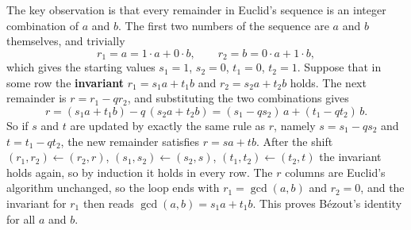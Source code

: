 The key observation is that every remainder in Euclid's sequence is an integer combination of $a$ and $b$. The first two numbers of the sequence are $a$ and $b$ themselves, and trivially
\[
r_1 = a = 1 \cdot a + 0 \cdot b, \qquad r_2 = b = 0 \cdot a + 1 \cdot b,
\]
which gives the starting values $s_1 = 1$, $s_2 = 0$, $t_1 = 0$, $t_2 = 1$. Suppose that in some row the \textbf{invariant} $r_1 = s_1 a + t_1 b$ and $r_2 = s_2 a + t_2 b$ holds. The next remainder is $r = r_1 - q r_2$, and substituting the two combinations gives
\[
r = (s_1 a + t_1 b) - q\,(s_2 a + t_2 b) = (s_1 - q s_2)\,a + (t_1 - q t_2)\,b .
\]
So if $s$ and $t$ are updated by exactly the same rule as $r$, namely $s = s_1 - q s_2$ and $t = t_1 - q t_2$, the new remainder satisfies $r = s a + t b$. After the shift $(r_1, r_2) \leftarrow (r_2, r)$, $(s_1, s_2) \leftarrow (s_2, s)$, $(t_1, t_2) \leftarrow (t_2, t)$ the invariant holds again, so by induction it holds in every row. The $r$ columns are Euclid's algorithm unchanged, so the loop ends with $r_1 = \gcd(a, b)$ and $r_2 = 0$, and the invariant for $r_1$ then reads $\gcd(a, b) = s_1 a + t_1 b$. This proves Bézout's identity for all $a$ and $b$.

